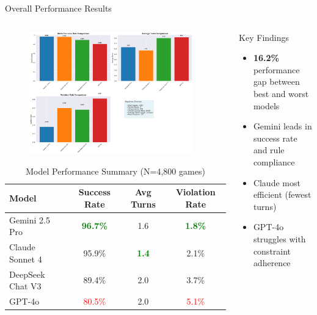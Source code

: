 \documentclass[aspectratio=169]{beamer}
\begin{document}
\begin{frame}{Overall Performance Results}
\begin{columns}
\begin{column}{0.6\textwidth}
\begin{figure}[h]
\centering
\includegraphics[width=0.95\textwidth]{comprehensive_figures/figure1_overview.png}
\end{figure}

\vspace{0.5cm}
\begin{table}
\centering
\scriptsize
\begin{tabular}{lccc}
\toprule
\textbf{Model} & \textbf{Success Rate} & \textbf{Avg Turns} & \textbf{Violation Rate} \\
\midrule
Gemini 2.5 Pro & \textcolor{green}{\textbf{96.7\%}} & 1.6 & \textcolor{green}{\textbf{1.8\%}} \\
Claude Sonnet 4 & 95.9\% & \textcolor{green}{\textbf{1.4}} & 2.1\% \\
DeepSeek Chat V3 & 89.4\% & 2.0 & 3.7\% \\
GPT-4o & \textcolor{red}{80.5\%} & 2.0 & \textcolor{red}{5.1\%} \\
\bottomrule
\end{tabular}
\caption{Model Performance Summary (N=4,800 games)}
\end{table}
\end{column}

\begin{column}{0.4\textwidth}
\begin{block}{Key Findings}
\begin{itemize}
    \item \textbf{16.2\%} performance gap between best and worst models
    \item Gemini leads in success rate and rule compliance
    \item Claude most efficient (fewest turns)
    \item GPT-4o struggles with constraint adherence
\end{itemize}
\end{block}


\end{column}
\end{columns}
\end{frame}
\end{document}
